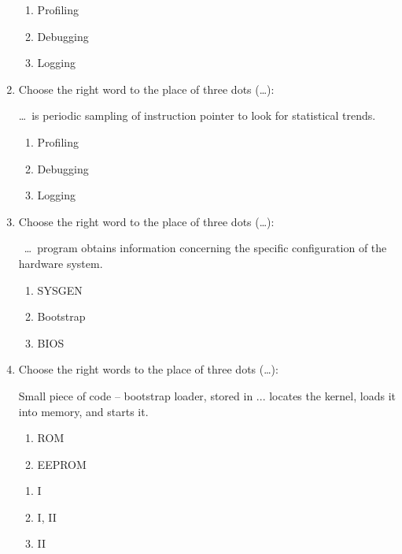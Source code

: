 \documentclass[paper=8.2in:11.6in]{scrartcl}
\begin{document}
\begin{enumerate}
\begin{enumerate}[label=\alph*)]
\item Profiling
\item Debugging
\item Logging

\end{enumerate}

\item Choose the right word to the place of three dots (\ldots):

\ldots \ is periodic sampling of instruction pointer to look for statistical trends.

\begin{enumerate}[label=\alph*)]

\item Profiling
\item Debugging
\item Logging

\end{enumerate}

\item Choose the right word to the place of three dots (\ldots):

\ \ldots \ program obtains information concerning the specific configuration of the hardware system.

\begin{enumerate}[label=\alph*)]

\item SYSGEN
\item Bootstrap
\item BIOS

\end{enumerate}

\item Choose the right words to the place of three dots (\ldots):

Small piece of code – bootstrap loader, stored in ... locates the kernel, loads it into memory, and starts it.

\begin{enumerate}[label=\Roman*.]

\item ROM
\item EEPROM

\end{enumerate}

\begin{enumerate}[label=\alph*)]

\item I
\item I, II
\item II


\end{enumerate}
\end{enumerate}
\end{document}
